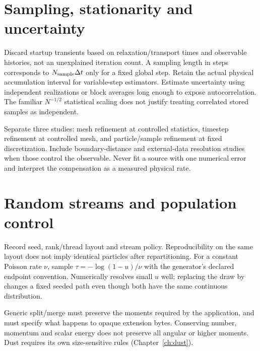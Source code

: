 \section{Sampling, stationarity and uncertainty}
Discard startup transients based on relaxation/transport times and observable
histories, not an unexplained iteration count. A sampling length in steps
corresponds to $N_{\rm sample}\Delta t$ only for a fixed global step.
Retain the actual physical accumulation interval for variable-step estimators.
Estimate uncertainty using independent realizations or block averages long
enough to expose autocorrelation. The familiar $N^{-1/2}$ statistical scaling
does not justify treating correlated stored samples as independent.

Separate three studies: mesh refinement at controlled statistics, timestep
refinement at controlled mesh, and particle/sample refinement at fixed
discretization. Include boundary-distance and external-data resolution studies
when those control the observable. Never fit a source with one numerical
error and interpret the compensation as a measured physical rate.

\section{Random streams and population control}
Record seed, rank/thread layout and stream policy. Reproducibility on the
same layout does not imply identical particles after repartitioning.
For a constant Poisson rate $\nu$, sample
$\tau=-\log(1-u)/\nu$ with the generator's declared endpoint convention.
Numerically  resolves small $u$ well; replacing the draw by
 changes a fixed seeded path even though both have the same
continuous distribution.

Generic split/merge must preserve the moments required by the application,
and must specify what happens to opaque extension bytes. Conserving number,
momentum and scalar energy does not preserve all angular or higher moments.
Dust requires its own size-sensitive rules (Chapter~\ref{ch:dust}).
